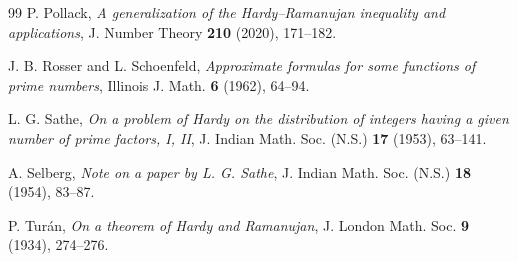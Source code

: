 \documentclass[12pt,a4paper,reqno]{amsart}
\theoremstyle{plain}
\numberwithin{sblmm}{thrm}
\numberwithin{equation}{section}
\begin{document}
\begin{thebibliography}{99}
P. Pollack,
\emph{A generalization of the Hardy--Ramanujan inequality and applications},
J. Number Theory \textbf{210} (2020), 171--182.

J. B. Rosser and L. Schoenfeld,
\emph{Approximate formulas for some functions of prime numbers},
Illinois J. Math. \textbf{6} (1962), 64--94.

L. G. Sathe,
\emph{On a problem of Hardy on the distribution of integers having a given number of prime factors, I, II},
J. Indian Math. Soc. (N.S.) \textbf{17} (1953), 63--141.

A. Selberg,
\emph{Note on a paper by L. G. Sathe},
J. Indian Math. Soc. (N.S.) \textbf{18} (1954), 83--87.

P. Tur\'{a}n,
\emph{On a theorem of Hardy and Ramanujan},
J. London Math. Soc. \textbf{9} (1934), 274--276.

\end{thebibliography}
\end{document}
